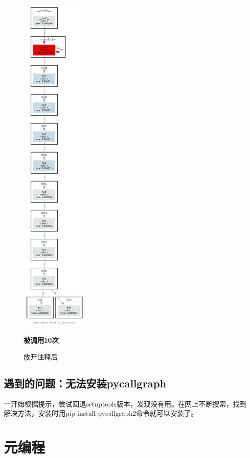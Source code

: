 \documentclass[UTF8,a4paper]{ctexart}
\begin{document}
\begin{figure}[H]
    \centering
    \includegraphics[width=0.3\textwidth]{./python/pycallgraph2.png}
    \caption{放开注释后}
    \textbf{\textcolor{color1}{被调用10次}}
\end{figure}


\subsection{遇到的问题：无法安装pycallgraph}
一开始根据提示，尝试回退setuptools版本，发现没有用。在网上不断搜索，找到解决方法，安装时用pip install pycallgraph2命令就可以安装了。

\section{元编程}
\end{document}
